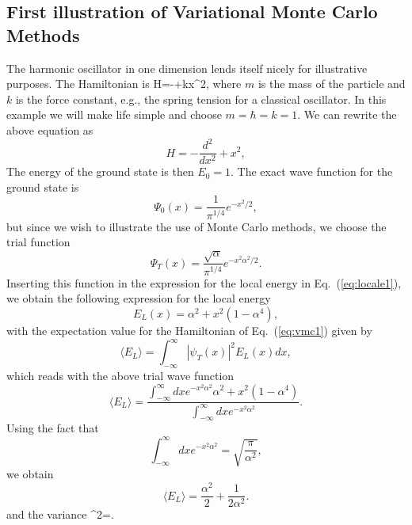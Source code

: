 \subsection{First illustration of Variational Monte Carlo Methods}

The harmonic oscillator in one dimension lends itself nicely for 
illustrative purposes. 
The Hamiltonian is 
\be
   \label{eq:hovmccalc}
   H=-+kx^2,
\ee
where $m$ is the mass of the particle and $k$ is the force
constant, e.g., the spring tension for a classical oscillator. 
In this example we will make life simple and choose
$m=\hbar=k=1$. 
We can rewrite the above  equation as 
\[
   H=-\frac{d^2}{dx^2}+x^2,
\]
The energy of the ground state is then
$E_0=1$. The exact wave function for the ground state is 
\[
\Psi_0(x)=\frac{1}{\pi^{1/4}}e^{-x^2/2},
\]
but since we wish to illustrate the use of Monte Carlo 
methods, we choose 
the trial function
\[
\Psi_T(x)=\frac{\sqrt{\alpha}}{\pi^{1/4}}e^{-x^2\alpha^2/2}.
  \label{eq:trialho}
\]
Inserting this function in the expression for the local energy
in Eq.~(\ref{eq:locale1}), 
we obtain the following expression for the local energy
\[
  E_L(x)=\alpha^2+x^2(1-\alpha^4),
\]
with the expectation value for the Hamiltonian of Eq.~(\ref{eq:vmc1}) 
given by
\[
   \langle E_L\rangle=\int_{-\infty}^{\infty}\left|\psi_T(x)\right|^2E_L(x)dx,
\]
which reads with the above trial wave function
\[
   \langle E_L\rangle=
   \frac{\int_{-\infty}^{\infty}dxe^{-x^2\alpha^2}\alpha^2+x^2(1-\alpha^4)}
{\int_{-\infty}^{\infty}dxe^{-x^2\alpha^2}}.
\]
Using the fact that
\[
   \int_{-\infty}^{\infty}dxe^{-x^2\alpha^2}=\sqrt{\frac{\pi}{\alpha^2}},
\]
we obtain
\[
   \langle E_L \rangle=\frac{\alpha^2}{2}+\frac{1}{2\alpha^2}.
\]
and the variance 
\be
  \sigma^2=.
  \label{eq:hovariance1}
\ee

